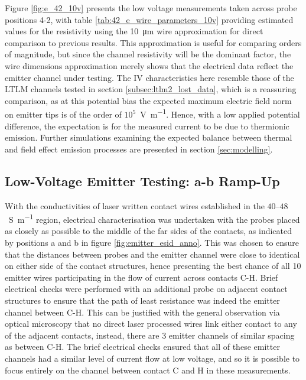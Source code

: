\begin{refsection}
Figure \ref{fig:e_42_10v} presents the low voltage measurements taken across probe positions 4-2, with table \ref{tab:42_e_wire_parameters_10v} providing estimated values for the resistivity using the 10~\si{\micro\metre} wire approximation for direct comparison to previous results. This approximation is useful for comparing orders of magnitude, but since the channel resistivity will be the dominant factor, the wire dimensions approximation merely shows that the electrical data reflect the emitter channel under testing. The IV characteristics here resemble those of the LTLM channels tested in section \ref{subsec:ltlm2_lost_data}, which is a reassuring comparison, as at this potential bias the expected maximum electric field norm on emitter tips is of the order of $10^{5}$~\si{\volt\per\metre}. Hence, with a low applied potential difference, the expectation is for the measured current to be due to thermionic emission. Further simulations examining the expected balance between thermal and field effect emission processes are presented in section \ref{sec:modelling}.

\subsection{Low-Voltage Emitter Testing: a-b Ramp-Up}
With the conductivities of laser written contact wires established in the $40$--$48$~\si{\siemens\per\metre} region, electrical characterisation was undertaken with the probes placed as closely as possible to the middle of the far sides of the contacts, as indicated by positions a and b in figure \ref{fig:emitter_esid_anno}. This was chosen to ensure that the distances between probes and the emitter channel were close to identical on either side of the contact structures, hence presenting the best chance of all 10 emitter wires participating in the flow of current across contacts C-H. Brief electrical checks were performed with an additional probe on adjacent contact structures to ensure that the path of least resistance was indeed the emitter channel between C-H. This can be justified with the general observation via optical microscopy that no direct laser processed wires link either contact to any of the adjacent contacts, instead, there are 3 emitter channels of similar spacing as between C-H. The brief electrical checks ensured that all of these emitter channels had a similar level of current flow at low voltage, and so it is possible to focus entirely on the channel between contact C and H in these measurements.


\end{refsection}
